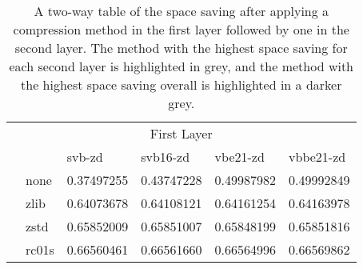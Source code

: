 \begin{table}
	\caption[A two-way table of the space saving after
applying a compression method in the first layer followed by one in the second
layer.]{\label{tab:results-layer}A two-way table of the space saving after
applying a compression method in the first layer followed by one in the second
layer. The method with the highest space saving for each second layer is
highlighted in grey, and the method with the highest space saving overall is
highlighted in a darker grey.}
    \begin{tabular}{l|l|l|l|l|l|}
\multicolumn{6}{c}{First Layer} \\
\cline{2-6}
\parbox[t]{3mm}{} &
& svb-zd & svb16-zd & vbe21-zd & vbbe21-zd \\
	    &none &0.37497255&0.43747228&0.49987982&0.49992849\\
&zlib & 0.64073678 & 0.64108121 & 0.64161254 & 0.64163978\\
&zstd & 0.65852009 & 0.65851007 & 0.65848199 & 0.65851816\\
&rc01s & 0.66560461 & 0.66561660 & 0.66564996 & 0.66569862\\
    \end{tabular}
\end{table}
